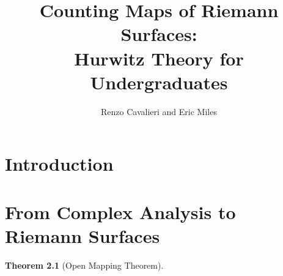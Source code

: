 \documentclass[12pt]{book}%
\theoremstyle{plain}
\newtheorem{theorem}{Theorem}[section]
\theoremstyle{definition}
\theoremstyle{remark}
\begin{document}
\title{Counting Maps of Riemann Surfaces: \\ Hurwitz Theory for Undergraduates}

\author{Renzo Cavalieri and Eric Miles}

\date{}

\maketitle





\tableofcontents



\chapter{Introduction}
\label{introduction}






\chapter{From Complex Analysis to Riemann Surfaces}
\label{complexAnalysis}



\begin{theorem}[Open Mapping Theorem]
\label{openMappingThm}
\end{theorem}
\end{document}
